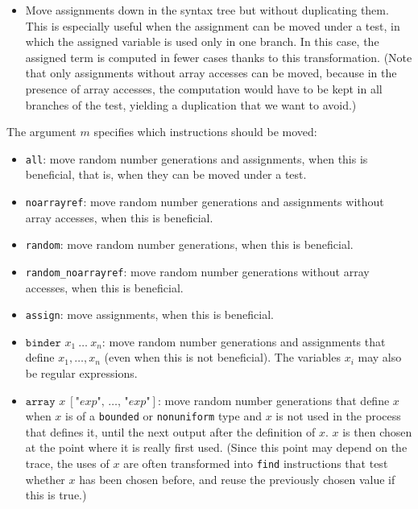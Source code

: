 \documentclass{article}
\begin{document}
\begin{itemize}
\begin{itemize}
\item Move assignments down in the syntax tree but without duplicating
  them. This is especially useful when the assignment can be moved
  under a test, in which the assigned variable is used only in one
  branch. In this case, the assigned term is computed in fewer cases
  thanks to this transformation.
  (Note that only assignments without array accesses can be moved,
  because in the presence of array accesses, the computation would have
  to be kept in all branches of the test, yielding a duplication that 
  we want to avoid.)

\end{itemize}
The argument $m$ specifies which instructions should be moved:
\begin{itemize}
\item \texttt{all}: move random number generations and assignments,
when this is beneficial, that is, when they can be moved under a test.
\item \texttt{noarrayref}: move random number generations and assignments
without array accesses, when this is beneficial.
\item \texttt{random}: move random number generations, when this is beneficial.
\item \texttt{random\string_noarrayref}: move random number generations 
without array accesses, when this is beneficial.
\item \texttt{assign}: move assignments, when this is beneficial.
\item $\texttt{binder }x_1\ \dots\ x_n$: move random number generations and assignments
that define $x_1, \ldots, x_n$ (even when this is not beneficial).
The variables $x_i$ may also be regular expressions.
\item $\texttt{array }x\ [\texttt{"}exp\texttt{", }\dots\texttt{, "}exp\texttt{"}]$: 
move random number generations that define $x$
when $x$ is of a {\tt bounded} or {\tt nonuniform} type and $x$ is not used in
the process that defines it, until the next output after the definition of $x$.
$x$ is then chosen at the point where it is really first used. 
(Since this point may depend on the trace, the uses of $x$ are often
transformed into {\tt find} instructions that test whether $x$ has been 
chosen before, and reuse the previously chosen value if this is true.)


\end{itemize}
\end{itemize}
\end{document}
